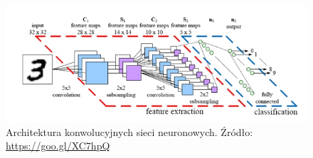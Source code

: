 \begin{figure}[ht!]
\centering
\includegraphics[scale=0.75]{res/cnn3.jpg}
\caption[Caption for LOF]{Architektura konwolucyjnych sieci neuronowych. Źródło: \url{https://goo.gl/XC7hpQ}\label{cnn3}} 
\end{figure}


